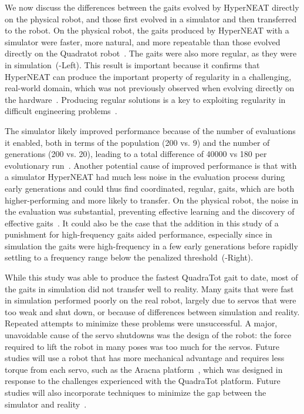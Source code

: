 We now discuss the differences between the gaits evolved by HyperNEAT directly on the physical robot, and those first evolved in a simulator and then transferred to the robot. 
On the physical robot, the gaits produced by HyperNEAT with a simulator were faster, more natural, and more repeatable than those evolved directly on the Quadratot robot~\cite{yos:clune}. The gaits were also more regular, as they were in simulation~(-Left). This result is important because it confirms that HyperNEAT can produce the important property of
regularity in a challenging, real-world domain, which was not previously observed when
evolving directly on the hardware~\cite{yos:clune}. Producing regular solutions is a key to exploiting regularity in difficult engineering problems~\cite{clune2011performance}. 


The simulator likely improved performance because of the number of evaluations it enabled, both in terms of the population (200 vs. 9) and the number of generations (200 vs. 20), leading
to a total difference of 40000 vs 180 per evolutionary run~\cite{yos:clune}. Another
potential cause of improved performance is that with a simulator
HyperNEAT had much less noise in the evaluation process during early
generations and could thus find coordinated, regular, gaits, which are
both higher-performing and more likely to transfer. On the physical robot, the noise in the evaluation was
substantial, preventing effective learning and the discovery of
effective gaits~\cite{yos:clune}. It could also be the case that 
the addition in this study of a punishment for high-frequency gaits
aided performance, especially since in simulation the gaits were
high-frequency in a few early generations before rapidly settling to a
frequency range below the penalized threshold~(-Right).



While this study was able to produce the fastest QuadraTot gait to
date, most of the gaits in simulation did not transfer well to
reality. Many gaits that were fast in simulation performed
poorly on the real robot, largely due to servos that were too weak and
shut down, or because of differences between simulation and
reality. Repeated attempts to minimize these problems were
unsuccessful.  A major, unavoidable cause of the servo shutdowns was
the design of the robot: the force required to lift the robot in many
poses was too much for the servos. Future studies will use a
robot that has more mechanical advantage and requires less torque from
each servo, such as the Aracna platform~\cite{lohmann2012aracna},
which was designed in response to the challenges experienced with the
QuadraTot platform. Future studies will also incorporate techniques to minimize the gap between the simulator and reality~\cite{koos2010crossing,bongard,zagal}.











